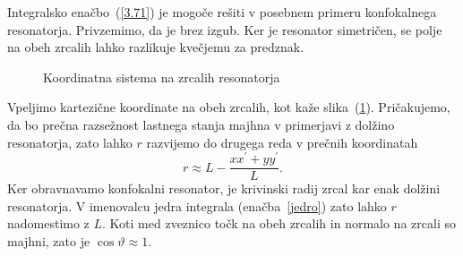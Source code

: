 Integralsko enačbo~(\ref{3.71}) je mogoče rešiti v posebnem primeru
konfokalnega resonatorja. Privzemimo, da je brez izgub. 
Ker je resonator simetričen, se polje na obeh zrcalih lahko razlikuje kvečjemu
za predznak.
\begin{figure}[h]
\centering
\def\svgwidth{100truemm} 

\caption{Koordinatna sistema na zrcalih resonatorja}
\label{fig:uklon_res_shema}
\end{figure}

Vpeljimo kartezične koordinate na obeh zrcalih, kot kaže slika~(\ref{fig:uklon_res_shema}).
Pričakujemo, da bo prečna razsežnost lastnega stanja majhna v primerjavi
z dolžino resonatorja, zato lahko $r$ razvijemo do drugega reda v
prečnih koordinatah
\begin{equation}
r\approx L-\frac{xx^{\prime}+yy^{\prime}}{L}.
\label{3.72}
\end{equation}
Ker obravnavamo konfokalni resonator, je krivinski radij zrcal kar enak dolžini resonatorja.
V imenovalcu jedra integrala (enačba~\ref{jedro}) zato lahko $r$ nadomestimo
z $L$. Koti med zveznico točk na obeh zrcalih in normalo na zrcali
so majhni, zato je  $\cos\vartheta \approx 1$. 

